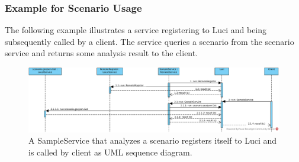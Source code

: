 \subsubsection{Example for Scenario Usage}
\label{ch:scenarios:example}
The following example illustrates a service registering to Luci and being subsequently called by a client. The service queries a scenario from the scenario service and returns some analysis result to the client.
\begin{figure}[h!]
	\centering
	\includegraphics[width=\textwidth]{bin/assets/scenario-sequence-diagram.pdf}
	\caption{A SampleService that analyzes a scenario registers itself to Luci and is called by client as UML sequence diagram.}
\end{figure}
\vfill
\clearpage
